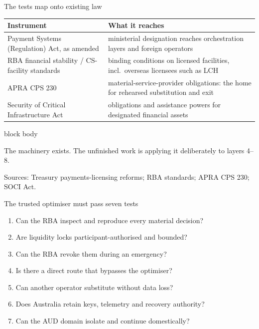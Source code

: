 \documentclass[aspectratio=169,12pt]{beamer}
\newcommand{\source}[1]{\vfill\par\fontsize{5.4}{6.5}\selectfont\color{Quiet}Sources: #1}
\newcommand{\tightitems}{\setlength{\itemsep}{0.42em}\setlength{\parskip}{0pt}}
\newenvironment{statement}{%
  \begin{beamercolorbox}[sep=.18cm,rounded=false,wd=\linewidth]{block body}%
  \fontsize{13}{15.5}\selectfont\bfseries
}{\end{beamercolorbox}}
\begin{document}
\begin{frame}{The tests map onto existing law}
  \fontsize{9.2}{10.9}\selectfont
  \begin{tabularx}{\textwidth}{L{3.25cm}Y}
    \toprule
    \textbf{Instrument} & \textbf{What it reaches} \\
    \midrule
    Payment Systems (Regulation) Act, as amended & ministerial designation reaches orchestration layers and foreign operators \\
    \addlinespace[0.16em]
    RBA financial stability / CS-facility standards & binding conditions on licensed facilities, incl.\ overseas licensees such as LCH \\
    \addlinespace[0.16em]
    APRA CPS 230 & material-service-provider obligations: the home for rehearsed substitution and exit \\
    \addlinespace[0.16em]
    Security of Critical Infrastructure Act & obligations and assistance powers for designated financial assets \\
    \bottomrule
  \end{tabularx}
  \vspace{0.10cm}
  \begin{statement}
    The machinery exists. The unfinished work is applying it deliberately to layers 4--8.
  \end{statement}
  \source{Treasury payments-licensing reforms; RBA standards; APRA CPS 230; SOCI Act.}
\end{frame}

\begin{frame}{The trusted optimiser must pass seven tests}
  \fontsize{10.3}{12.4}\selectfont
  \begin{enumerate}\tightitems
    \item Can the RBA inspect and reproduce every material decision?
    \item Are liquidity locks participant-authorised and bounded?
    \item Can the RBA revoke them during an emergency?
    \item Is there a direct route that bypasses the optimiser?
    \item Can another operator substitute without data loss?
    \item Does Australia retain keys, telemetry and recovery authority?
    \item Can the AUD domain isolate and continue domestically?
  \end{enumerate}
\end{frame}
\end{document}
